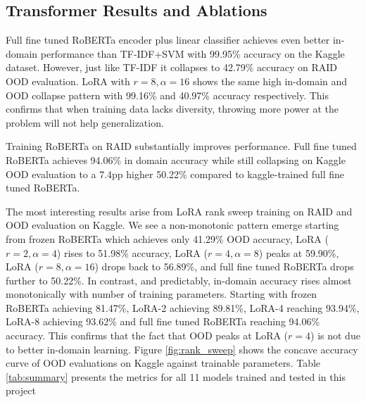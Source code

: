 \documentclass{article}
\begin{document}
\subsection{Transformer Results and Ablations}
Full fine tuned RoBERTa encoder plus linear classifier achieves even better in-domain performance than TF-IDF+SVM with 99.95\% accuracy on the Kaggle dataset. However, just like TF-IDF it collapses to 42.79\% accuracy on RAID OOD evaluation. LoRA with $r{=}8, \alpha{=}16$ shows the same high in-domain and OOD collapse pattern  with 99.16\% and 40.97\% accuracy respectively. This confirms that when training data lacks diversity, throwing more power at the problem will not help generalization.

Training RoBERTa on RAID substantially improves performance. Full fine tuned RoBERTa achieves 94.06\% in domain accuracy while still collapsing on Kaggle OOD evaluation to a 7.4pp higher  50.22\% compared to kaggle-trained full fine tuned RoBERTa.

The most interesting results arise from LoRA rank sweep training on RAID and OOD evaluation on Kaggle. We see a non-monotonic pattern emerge starting from frozen RoBERTa which achieves only 41.29\% OOD accuracy, LoRA ($r{=}2,\alpha{=}4$) rises to 51.98\% accuracy, LoRA ($r{=}4, \alpha{=}8$) peaks at
59.90\%, LoRA ($r{=}8, \alpha{=}16$) drops back to 56.89\%, and full fine tuned RoBERTa drops further to 50.22\%. In contrast, and predictably, in-domain accuracy rises almost monotonically with number of  training parameters. Starting with frozen RoBERTa achieving 81.47\%, LoRA-2 achieving 89.81\%, LoRA-4 reaching 93.94\%, LoRA-8 achieving 93.62\% and full fine tuned RoBERTa reaching 94.06\% accuracy. This confirms that the fact that OOD peaks at LoRA ($r=4$) is not due to better in-domain learning. Figure \ref{fig:rank_sweep} shows the concave accuracy curve of OOD evaluations on Kaggle against trainable parameters. Table \ref{tab:summary} presents the metrics for all 11 models trained and tested in this project
\end{document}

